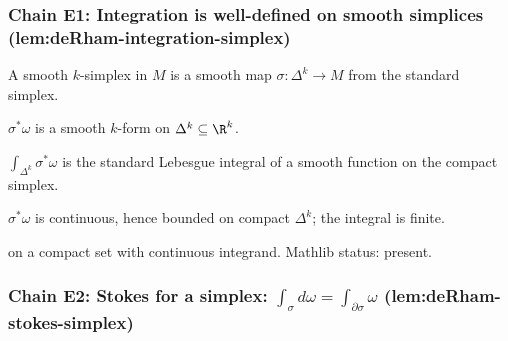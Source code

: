\subsubsection*{Chain E1: Integration is well-defined on smooth simplices (lem:deRham-integration-simplex)}

\begin{lemma}
\label{lem:dis-r1}
A smooth $k$-simplex in $M$ is a smooth map $\sigma : \Delta^{k} \to M$ from the standard simplex.
\leanok
\end{lemma}

\begin{lemma}
\label{lem:dis-r2}
$\sigma^{*}\omega$ is a smooth $k$-form on $\Delta^{k} \subseteq \R^{k}$.
\leanok
\end{lemma}

\begin{lemma}
\label{lem:dis-r3}
$\int_{\Delta^{k}} \sigma^{*}\omega$ is the standard Lebesgue integral of a smooth function on the compact simplex.
\leanok\mathlibok
\end{lemma}

\begin{lemma}
\label{lem:dis-r4}
$\sigma^{*}\omega$ is continuous, hence bounded on compact $\Delta^{k}$; the integral is finite.
\leanok\mathlibok
\end{lemma}

\begin{lemma}
\label{lem:dis-r5}
 on a compact set with continuous integrand.  Mathlib status: present.
\leanok\mathlibok
\end{lemma}

\subsubsection*{Chain E2: Stokes for a simplex: $\int_{\sigma} d\omega = \int_{\partial\sigma} \omega$ (lem:deRham-stokes-simplex)}

